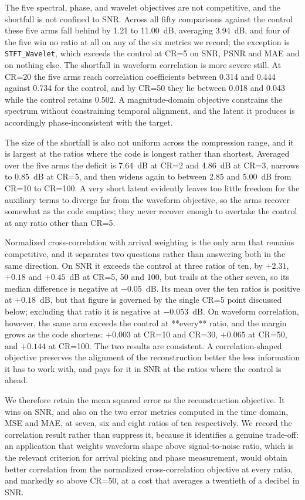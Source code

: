 \documentclass[fleqn,10pt]{wlscirep}
\begin{document}
The five spectral, phase, and wavelet objectives are not competitive, and the shortfall is not confined to SNR. Across all fifty comparisons against the control these five arms fall behind by 1.21 to 11.00~dB, averaging 3.94~dB, and four of the five win no ratio at all on any of the six metrics we record; the exception is \texttt{STFT\_Wavelet}, which exceeds the control at CR=5 on SNR, PSNR and MAE and on nothing else. The shortfall in waveform correlation is more severe still. At CR=20 the five arms reach correlation coefficients between 0.314 and 0.444 against 0.734 for the control, and by CR=50 they lie between 0.018 and 0.043 while the control retains 0.502. A magnitude-domain objective constrains the spectrum without constraining temporal alignment, and the latent it produces is accordingly phase-inconsistent with the target.

The size of the shortfall is also not uniform across the compression range, and it is largest at the ratios where the code is longest rather than shortest. Averaged over the five arms the deficit is 7.64~dB at CR=2 and 4.86~dB at CR=3, narrows to 0.85~dB at CR=5, and then widens again to between 2.85 and 5.00~dB from CR=10 to CR=100. A very short latent evidently leaves too little freedom for the auxiliary terms to diverge far from the waveform objective, so the arms recover somewhat as the code empties; they never recover enough to overtake the control at any ratio other than CR=5.

Normalized cross-correlation with arrival weighting is the only arm that remains competitive, and it separates two questions rather than answering both in the same direction. On SNR it exceeds the control at three ratios of ten, by $+2.31$, $+0.18$ and $+0.45$~dB at CR=5, 50 and 100, but trails at the other seven, so its median difference is negative at $-0.05$~dB. Its mean over the ten ratios is positive at $+0.18$~dB, but that figure is governed by the single CR=5 point discussed below; excluding that ratio it is negative at $-0.053$~dB. On waveform correlation, however, the same arm exceeds the control at **every** ratio, and the margin grows as the code shortens: $+0.003$ at CR=10 and CR=30, $+0.065$ at CR=50, and $+0.144$ at CR=100. The two results are consistent. A correlation-shaped objective preserves the alignment of the reconstruction better the less information it has to work with, and pays for it in SNR at the ratios where the control is ahead.

We therefore retain the mean squared error as the reconstruction objective. It wins on SNR, and also on the two error metrics computed in the time domain, MSE and MAE, at seven, six and eight ratios of ten respectively. We record the correlation result rather than suppress it, because it identifies a genuine trade-off: an application that weights waveform shape above signal-to-noise ratio, which is the relevant criterion for arrival picking and phase measurement, would obtain better correlation from the normalized cross-correlation objective at every ratio, and markedly so above CR=50, at a cost that averages a twentieth of a decibel in SNR.
\end{document}
